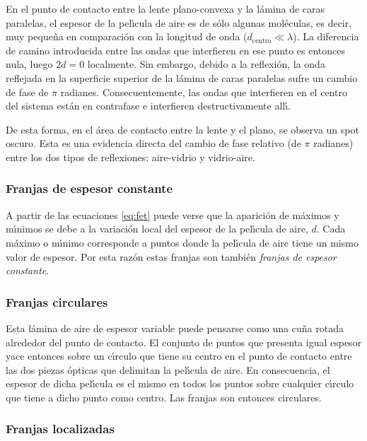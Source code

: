 \documentclass[a4paper]{article}
\begin{document}
En el punto de contacto entre la lente plano-convexa y la l\'amina de caras
paralelas, el espesor de la pel\'\i cula de aire es de s\'olo algunas 
mol\'eculas, es decir, muy peque\~na en comparaci\'on con la longitud de onda
($d_\text{centro} \ll \lambda$). La diferencia de camino introducida entre las
ondas que interfieren en ese punto es entonces nula, luego $2 d = 0$ 
localmente. Sin embargo, debido a la reflexi\'on, la onda reflejada en la 
superficie superior de la l\'amina de caras paralelas sufre un cambio de fase
de $\pi$ radianes. Consecuentemente, las ondas que interfieren en el centro
del sistema est\'an en contrafase e interfieren destructivamente all\'\i .

De esta forma, en el \'area de contacto entre la lente y el plano, se observa
un spot oscuro. Esta es una evidencia directa del cambio de fase relativo
(de $\pi$ radianes) entre los dos tipos de reflexiones: aire-vidrio y 
vidrio-aire. 

\subsubsection{Franjas de espesor constante}

A partir de las ecuaciones \eqref{eq:fet} puede verse que la aparici\'on de
m\'aximos y m\'\i nimos se debe a la variaci\'on local del espesor de la 
pel\'\i cula de aire, $d$. Cada m\'aximo o m\'\i nimo corresponde a puntos
donde la pel\'\i cula de aire tiene un mismo valor de espesor. Por esta raz\'on
estas franjas son tambi\'en {\it franjas de espesor constante}. 

\subsubsection{Franjas circulares}

Esta l\'amina de aire de espesor variable puede pensarse como una cu\~na rotada
alrededor del punto de contacto. El conjunto de puntos que presenta igual 
espesor yace entonces sobre un c\'\i rculo que tiene su centro en el punto
de contacto entre las dos piezas \'opticas que delimitan la pel\'\i cula de 
aire. En consecuencia, el espesor de dicha pel\'\i cula es el mismo en todos
los puntos sobre cualquier c\'\i rculo que tiene a dicho punto como centro. 
Las franjas son entonces circulares.

\subsubsection{Franjas localizadas}
\end{document}
